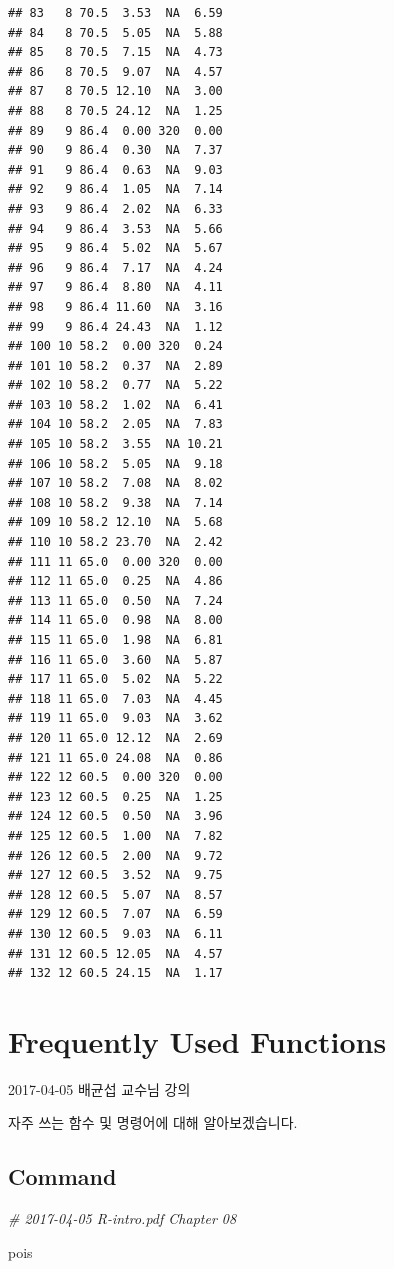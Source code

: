 \documentclass[10pt,]{krantz}
\makeatletter
\newenvironment{Shaded}{\begin{snugshade}}{\end{snugshade}}
\newcommand{\CommentTok}[1]{\textcolor[rgb]{0.56,0.35,0.01}{\textit{#1}}}
\newcommand{\NormalTok}[1]{#1}
\renewenvironment{quote}{\begin{VF}}{\end{VF}}
\newenvironment{kframe}{%
\medskip{}
\setlength{\fboxsep}{.8em}
 \def\at@end@of@kframe{}%
 \ifinner\ifhmode%
  \def\at@end@of@kframe{\end{minipage}}%
  \begin{minipage}{\columnwidth}%
 \fi\fi%
 \def\FrameCommand##1{\hskip\@totalleftmargin \hskip-\fboxsep
 \colorbox{shadecolor}{##1}\hskip-\fboxsep
     \hskip-\linewidth \hskip-\@totalleftmargin \hskip\columnwidth}%
 \MakeFramed {\advance\hsize-\width
   \@totalleftmargin\z@ \linewidth\hsize
   \@setminipage}}%
 {\par\unskip\endMakeFramed%
 \at@end@of@kframe}
\renewenvironment{Shaded}{\begin{kframe}}{\end{kframe}}
\makeatother
\begin{document}
\begin{verbatim}
## 83   8 70.5  3.53  NA  6.59
## 84   8 70.5  5.05  NA  5.88
## 85   8 70.5  7.15  NA  4.73
## 86   8 70.5  9.07  NA  4.57
## 87   8 70.5 12.10  NA  3.00
## 88   8 70.5 24.12  NA  1.25
## 89   9 86.4  0.00 320  0.00
## 90   9 86.4  0.30  NA  7.37
## 91   9 86.4  0.63  NA  9.03
## 92   9 86.4  1.05  NA  7.14
## 93   9 86.4  2.02  NA  6.33
## 94   9 86.4  3.53  NA  5.66
## 95   9 86.4  5.02  NA  5.67
## 96   9 86.4  7.17  NA  4.24
## 97   9 86.4  8.80  NA  4.11
## 98   9 86.4 11.60  NA  3.16
## 99   9 86.4 24.43  NA  1.12
## 100 10 58.2  0.00 320  0.24
## 101 10 58.2  0.37  NA  2.89
## 102 10 58.2  0.77  NA  5.22
## 103 10 58.2  1.02  NA  6.41
## 104 10 58.2  2.05  NA  7.83
## 105 10 58.2  3.55  NA 10.21
## 106 10 58.2  5.05  NA  9.18
## 107 10 58.2  7.08  NA  8.02
## 108 10 58.2  9.38  NA  7.14
## 109 10 58.2 12.10  NA  5.68
## 110 10 58.2 23.70  NA  2.42
## 111 11 65.0  0.00 320  0.00
## 112 11 65.0  0.25  NA  4.86
## 113 11 65.0  0.50  NA  7.24
## 114 11 65.0  0.98  NA  8.00
## 115 11 65.0  1.98  NA  6.81
## 116 11 65.0  3.60  NA  5.87
## 117 11 65.0  5.02  NA  5.22
## 118 11 65.0  7.03  NA  4.45
## 119 11 65.0  9.03  NA  3.62
## 120 11 65.0 12.12  NA  2.69
## 121 11 65.0 24.08  NA  0.86
## 122 12 60.5  0.00 320  0.00
## 123 12 60.5  0.25  NA  1.25
## 124 12 60.5  0.50  NA  3.96
## 125 12 60.5  1.00  NA  7.82
## 126 12 60.5  2.00  NA  9.72
## 127 12 60.5  3.52  NA  9.75
## 128 12 60.5  5.07  NA  8.57
## 129 12 60.5  7.07  NA  6.59
## 130 12 60.5  9.03  NA  6.11
## 131 12 60.5 12.05  NA  4.57
## 132 12 60.5 24.15  NA  1.17
\end{verbatim}

\chapter{Frequently Used Functions}\label{frequently-used-functions}

\begin{quote}
2017-04-05 배균섭 교수님 강의
\end{quote}

자주 쓰는 함수 및 명령어에 대해 알아보겠습니다.

\section{Command}\label{command}

\begin{Shaded}
\begin{Highlighting}[]
\CommentTok{# 2017-04-05 R-intro.pdf Chapter 08}

\NormalTok{pois}
\end{Highlighting}
\end{Shaded}
\end{document}
